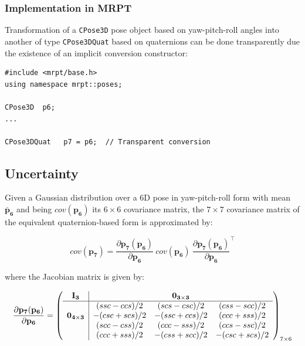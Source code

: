 \documentclass[a4paper,10pt]{report}
\begin{document}
\subsubsection{Implementation in MRPT}

Transformation of a \texttt{CPose3D} pose object based on yaw-pitch-roll angles 
into another of type \texttt{CPose3DQuat} based on quaternions can be done transparently 
due the existence of an implicit conversion constructor:

\begin{lstlisting}
#include <mrpt/base.h> 
using namespace mrpt::poses; 

CPose3D  p6;
...

CPose3DQuat   p7 = p6;  // Transparent conversion
\end{lstlisting}


\subsection{Uncertainty}

Given a Gaussian distribution over a 6D pose in yaw-pitch-roll form with 
mean ${\mathbf{\bar{p}_6}}$ and being  $cov(\mathbf{p_6})$ its $6 \times 6$ covariance matrix, 
the $7 \times 7$ covariance matrix of the equivalent quaternion-based form 
is approximated by:

\begin{equation}
cov(\mathbf{p_7}) =
\frac{\partial \mathbf{p_7}(\mathbf{p_6}) }{\partial \mathbf{p_6}} ~ 
cov(\mathbf{p_6})  ~
\frac{\partial \mathbf{p_7}(\mathbf{p_6}) }{\partial \mathbf{p_6}}^\top 
\end{equation}

\noindent where the Jacobian matrix is given by:

\begin{equation}
\frac{\partial \mathbf{p_7}(\mathbf{p_6}) }{\partial \mathbf{p_6}} =
\left(
\begin{array}{c|cccc}
 \mathbf{I_3} & & \mathbf{0_{3\times 3}} & \\ \hline
  & (ssc-ccs)/2 & (scs-csc)/2 & (css-scc)/2 \\
 \mathbf{0_{4\times 3}}
  & -(csc+scs)/2 & -(ssc+ccs)/2 & (ccc+sss)/2 \\
  & (scc-css)/2 & (ccc-sss)/2 & (ccs-ssc)/2 \\ 
  & (ccc+sss)/2 & -(css+scc)/2 & -(csc+scs)/2 \\ 
\end{array}
\right)_{7 \times 6}
\end{equation}
\end{document}
